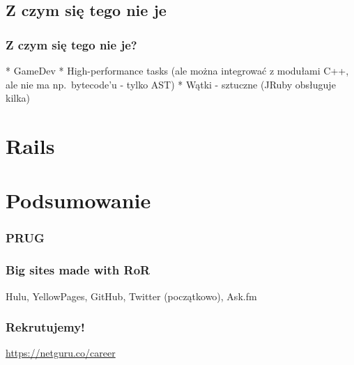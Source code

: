 \documentclass{beamer}
\begin{document}
\subsection{Z czym się tego nie je}

\begin{frame}[fragile]
\frametitle{Z czym się tego nie je?}
    * GameDev
    * High-performance tasks (ale można integrować z modułami C++, ale nie ma np.\ bytecode'u - tylko AST)
    * Wątki - sztuczne (JRuby obsługuje kilka)
\end{frame}

\section{Rails}


\section{Podsumowanie}

\begin{frame}[fragile]
\frametitle{PRUG}
\end{frame}

\begin{frame}[fragile]
\frametitle{Big sites made with RoR}
Hulu, YellowPages, GitHub, Twitter (początkowo), Ask.fm
\end{frame}

\begin{frame}[fragile]
\frametitle{Rekrutujemy!}
\url{https://netguru.co/career}
\end{frame}
\end{document}
